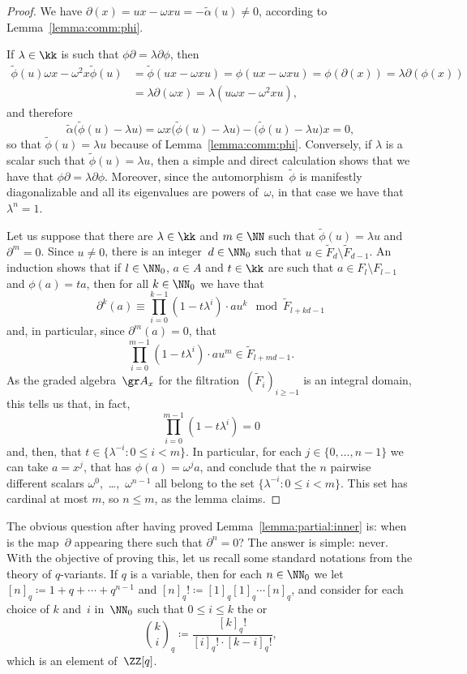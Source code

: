 \begin{proof}
 We have $\partial(x)=ux-\omega xu=-\tilde\alpha(u)\neq0$,
according to Lemma~\ref{lemma:comm:phi}.

 If $\lambda\in\kk$ is such that
$\phi\partial=\lambda\partial\phi$, then
  \begin{align}
  \tilde\phi(u)\omega x - \omega^2 x\tilde\phi(u)
       &= \tilde\phi(ux-\omega xu) 
        = \phi(ux-\omega xu) 
        = \phi(\partial(x))
        = \lambda\partial(\phi(x)) \\
       &= \lambda\partial(\omega x) 
        = \lambda(u\omega x-\omega^2xu),
  \end{align}
and therefore
  \[
  \tilde\alpha\bigl(\tilde\phi(u)-\lambda u\bigr) 
        = \omega x\bigl(\tilde\phi(u)-\lambda u\bigr)
          - \bigl(\tilde\phi(u)-\lambda u\bigr)x 
        = 0,
  \]
so that $\tilde\phi(u)=\lambda u$ because of Lemma~\ref{lemma:comm:phi}.
Conversely, if $\lambda$ is a scalar such that $\tilde\phi(u)=\lambda u$,
then a simple and direct calculation shows that we have that
$\phi\partial=\lambda\partial\phi$. Moreover, since the
automorphism~$\tilde\phi$ is manifestly diagonalizable and all its
eigenvalues are powers of~$\omega$, in that case we have that
$\lambda^n=1$.

 Let us suppose that there are $\lambda\in\kk$ and $m\in\NN$
such that $\tilde\phi(u)=\lambda u$ and $\partial^m=0$. Since $u\neq0$,
there is an integer~$d\in\NN_0$ such that $u\in\tilde F_d\setminus\tilde
F_{d-1}$. An induction shows that if $l\in\NN_0$, $a\in A$ and $t\in\kk$
are such that $a\in F_l\setminus F_{l-1}$ and $\phi(a)=ta$, then for all
$k\in\NN_0$ we have that
  \[
  \partial^k(a) \equiv \prod_{i=0}^{k-1}(1-t\lambda^i)\cdot au^k
        \mod \tilde F_{l+kd-1}
  \]
and, in particular, since $\partial^m(a)=0$, that
  \[
  \prod_{i=0}^{m-1}(1-t\lambda^i)\cdot au^m \in \tilde F_{l+md-1}.
  \]
As the graded algebra~$\gr A_x$ for the filtration~$(\tilde F_i)_{i\geq-1}$
is an integral domain, this tells us that, in fact,
  \[
  \prod_{i=0}^{m-1}(1-t\lambda^i) = 0
  \]
and, then, that $t\in\{\lambda^{-i}:0\leq i<m\}$. In particular, for each
$j\in\{0,\dots,n-1\}$ we can take $a=x^j$, that has $\phi(a)=\omega^j a$,
and conclude that the $n$ pairwise different scalars
$\omega^0$,~\dots,~$\omega^{n-1}$ all belong to the set
$\{\lambda^{-i}:0\leq i<m\}$. This set has cardinal at most $m$, so
$n\leq m$, as the lemma claims.
\end{proof}

The obvious question after having proved Lemma~\ref{lemma:partial:inner}
is: when is the map~$\partial$ appearing there such that $\partial^n=0$?
The answer is simple: never. With the objective of proving this, let us
recall some standard notations from the theory of $q$-variants. If $q$ is a
variable, then for each $n\in\NN_0$ we let $[n]_q\coloneqq
1+q+\cdots+q^{n-1}$ and $[n]_q!\coloneqq[1]_q[1]_q\cdots[n]_q$, and
consider for each choice of $k$ and~$i$ in~$\NN_0$ such that $0\leq i\leq
k$ the  or 
  \[
  \binom{k}{i}_q \coloneqq \frac{[k]_q!}{[i]_q!\cdot[k-i]_q!},
  \]
which is an element of~$\ZZ[q]$.

